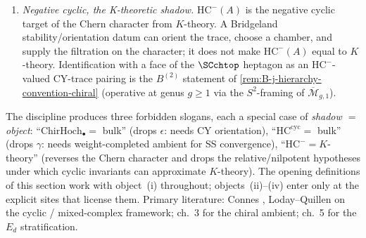 \begin{remark}
\begin{enumerate}[label=\textup{(\roman*)}]
$=$ bulk is licensed only under the ambient declaration.
\item \emph{Negative cyclic, the K-theoretic shadow.}
$\mathrm{HC}^{-}(A)$ is the negative cyclic target of the
Chern character from $K$-theory. A Bridgeland
stability/orientation datum can orient the trace, choose a chamber,
and supply the filtration on the character; it does not make
$\mathrm{HC}^{-}(A)$ equal to $K$-theory. Identification with a
face of the $\SCchtop$ heptagon as an $\mathrm{HC}^-$-valued
CY-trace pairing is the $B^{(2)}$ statement of
\cref{rem:B-j-hierarchy-convention-chiral} (operative at genus
$g \ge 1$ via the $S^2$-framing of
$\overline{\mathcal M}_{g,1}$).
\end{enumerate}
The discipline produces three forbidden slogans, each a special
case of \emph{shadow $=$ object}:
``$\mathrm{ChirHoch}_{\bullet} = $ bulk'' (drops $\epsilon$:
needs CY orientation),
``$\mathrm{HC}^{\mathrm{cyc}} = $ bulk'' (drops $\gamma$: needs
weight-completed ambient for SS convergence),
``$\mathrm{HC}^{-} = K$-theory'' (reverses the Chern character
and drops the relative/nilpotent hypotheses under which cyclic
invariants can approximate $K$-theory). The opening definitions of this
section work with object~(i) throughout; objects~(ii)--(iv) enter
only at the explicit sites that license them. Primary literature:
Connes \cite{Con85}, Loday--Quillen \cite{LQ84} on the cyclic /
mixed-complex framework; \cite{BD04} ch.~3 for the chiral
ambient; \cite{HA} ch.~5 for the $E_d$ stratification.
\end{remark}

